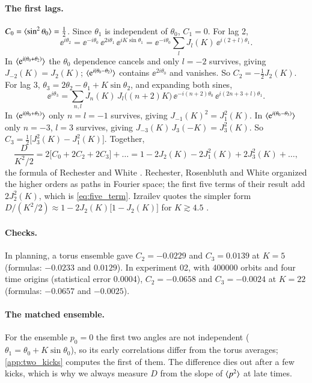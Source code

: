 \paragraph{The first lags.}
$C_0 = \langle \sin^2\theta_0 \rangle = \tfrac12$. Since $\theta_1$ is independent of $\theta_0$, $C_1 = 0$. For lag 2,
\begin{equation}
  \ee^{i\theta_2} = \ee^{-i\theta_0}\,\ee^{2i\theta_1}\,\ee^{iK\sin\theta_1}
  = \ee^{-i\theta_0}\sum_l J_l(K)\,\ee^{i(2+l)\theta_1}.
\end{equation}
In $\langle \mathrm{e}^{i(\theta_0 + \theta_2)} \rangle$ the $\theta_0$ dependence cancels and only $l = -2$ survives, giving
$J_{-2}(K) = J_2(K)$; $\langle \mathrm{e}^{i(\theta_0 - \theta_2)} \rangle$ contains $\ee^{2i\theta_0}$ and vanishes. So
$C_2 = -\tfrac12 J_2(K)$. For lag 3, $\theta_3 = 2\theta_2 - \theta_1 + K\sin\theta_2$, and expanding both
sines,
\begin{equation}
  \ee^{i\theta_3} = \sum_{n,l} J_n(K)\,J_l\bigl((n+2)K\bigr)\,\ee^{-i(n+2)\theta_0}\,\ee^{i(2n+3+l)\theta_1}.
\end{equation}
In $\langle \mathrm{e}^{i(\theta_0 + \theta_3)} \rangle$ only $n = l = -1$ survives, giving $J_{-1}(K)^2 = J_1^2(K)$. In
$\langle \mathrm{e}^{i(\theta_0 - \theta_3)} \rangle$ only $n = -3$, $l = 3$ survives, giving $J_{-3}(K)\,J_3(-K) = J_3^2(K)$.
So $C_3 = \tfrac12\bigl[J_3^2(K) - J_1^2(K)\bigr]$. Together,
\begin{equation}
  \frac{D}{K^2/2} = 2\bigl[C_0 + 2C_2 + 2C_3\bigr] + \dots = 1 - 2J_2(K) - 2J_1^2(K) + 2J_3^2(K) + \dots,
\end{equation}
the formula of Rechester and White \cite{Rechester1980}. Rechester, Rosenbluth and White organized the
higher orders as paths in Fourier space; the first five terms of their result \cite{Rechester1981} add
$2J_2^2(K)$, which is \cref{eq:five_term}. Izrailev quotes the simpler form
$D/(K^2/2) \approx 1 - 2J_2(K)\bigl[1 - J_2(K)\bigr]$ for $K \gtrsim 4.5$ \cite{Izrailev1990}.

\paragraph{Checks.}
In planning, a torus ensemble gave $C_2 = -0.0229$ and $C_3 = 0.0139$ at $K = 5$ (formulas: $-0.0233$ and
$0.0129$). In experiment 02, with 400000 orbits and four time origins (statistical error 0.0004), $C_2 =
-0.0658$ and $C_3 = -0.0024$ at $K = 22$ (formulas: $-0.0657$ and $-0.0025$).

\paragraph{The matched ensemble.}
For the ensemble $p_0 = 0$ the first two angles are not independent ($\theta_1 = \theta_0 + K\sin\theta_0$),
so its early correlations differ from the torus averages; \cref{app:two_kicks} computes the first of them.
The difference dies out after a few kicks, which is why we always measure $D$ from the slope of $\langle p^2 \rangle$ at
late times.
